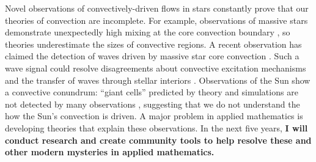 \documentclass[12pt]{article}
\begin{document}
\thispagestyle{fancy}

Novel observations of convectively-driven flows in stars constantly prove that our theories of convection are incomplete.
For example, observations of massive stars demonstrate unexpectedly high mixing at the core convection boundary \citep{johnston_2021}, so theories underestimate the sizes of convective regions.
A recent observation has claimed the detection of waves driven by massive star core convection \citep{bowman_etal_2019}.
Such a wave signal could resolve disagreements about convective excitation mechanisms and the transfer of waves through stellar interiors \citep{rogers_etal_2013,lecoanet_etal_2021}.
Observations of the Sun show a convective conundrum: ``giant cells'' predicted by theory and simulations are not detected by many observations \citep{hanasoge&all2012,proxauf_2021}, suggesting that we do not understand the how the Sun's convection is driven.
A major problem in applied mathematics is developing theories that explain these observations.
In the next five years, \textbf{I will conduct research and create community tools to help resolve these and other modern mysteries in applied mathematics.}

\end{document}
